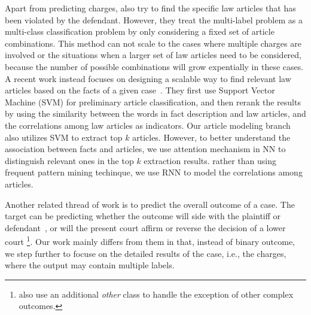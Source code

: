 Apart from predicting charges, \cite{liu2005classifying,liu2006exploring} also try to find the specific law articles that has been violated by the defendant. However, they treat the multi-label problem as a multi-class classification problem by only considering a fixed set of article combinations. This method can not scale to the cases where multiple charges are involved or the situations when a larger set of law articles need to be considered, because the number of possible combinations will grow expentially in these cases. 
A recent work instead focuses on designing a scalable way to find relevant law articles based on the facts of a given case~\cite{liu2015predicting}.
They first use Support Vector Machine (SVM) for preliminary article classification, and then 
rerank the results by using the similarity between the words in fact description and law articles, and the correlations among law articles as indicators.
Our article modeling branch also utilizes SVM to extract top $k$ articles. However, to better understand the association between facts and articles, we use attention mechanism in NN to distinguish relevant ones in the top $k$ extraction results.  rather than using frequent pattern mining techinque, we use RNN to model the correlations among articles.

Another related thread of work is to predict the overall outcome of a case. The target can be predicting whether the outcome will side with the plaintiff or defendant~\cite{bruninghaus2003predicting,aletras2016predicting}, or will the present court affirm or reverse the decision of a lower court \cite{lauderdale2014scaling,sim2015utility,katz2016general}\footnote{\cite{katz2016general} also use an additional \emph{other} class to handle the exception of other complex outcomes.}. Our work mainly differs from them in that, instead of binary outcome, we step further to focuse on the detailed results of the case, i.e., the charges, where the output may contain multiple labels. 





